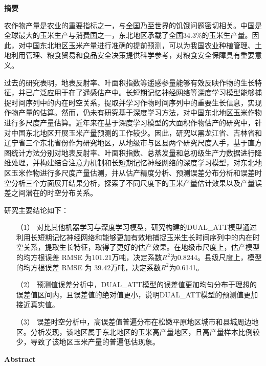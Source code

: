 \cleardoublepage{}
\begin{center}
    \bfseries {} 摘要
\end{center}

\par 农作物产量是农业的重要指标之一，与全国乃至世界的饥饿问题密切相关。中国是全球最大的玉米生产与消费国之一，东北地区承载了全国34.3\%的玉米生产量。因此，对中国东北地区玉米产量进行准确的提前预测，可以为我国农业种植管理、土地利用管理、粮食贸易和食品安全决策提供科学参考，对粮食安全保障具有重要意义。

\par 过去的研究表明，地表反射率、叶面积指数等遥感参量能够有效反映作物的生长特征，并已广泛应用于在了遥感估产中。长短期记忆神经网络等深度学习模型能够捕捉时间序列中的内在时空关系，提取并学习作物时间序列中的重要生长信息，实现作物产量的估算。然而，仍未有研究基于深度学习方法，对中国东北地区玉米作物进行多尺度产量估算。近年来在基于深度学习模型的大面积作物估产的研究中，针对中国东北地区开展玉米产量预测的工作较少。因此，研究以黑龙江省、吉林省和辽宁省三个东北省份作为研究地区，从地级市与区县两个研究尺度入手，基于直方图统计方法分别对地表反射率、叶面积指数、总蒸发量和总初级生产力数据进行降维处理，并构建结合注意力机制和长短期记忆神经网络的深度学习模型，对东北地区玉米作物进行多尺度产量估测，并从估产精度分析、预测误差分布分析和误差时空分析三个方面展开结果分析，探索了不同尺度下的玉米产量估计效果以及产量误差之间潜在的时空分布关系。

\par 研究主要结论如下：

\begin{itemize}
  \item [（1）] 对比其他机器学习与深度学习模型，研究构建的DUAL\_ATT模型通过利用长短期记忆神经网络和能够更加有效地捕捉玉米生长时间序列中的内在时空关系，提取生长特征，取得了更好的估产效果。在地级市尺度上，估产模型的均方根误差 RMSE 为101.21万吨，决定系数$R^2$为0.8244。县级尺度上，模型的均方根误差 RMSE 为 39.42万吨，决定系数$R^2$为0.6141。
  \item [（2）] 预测值误差分析中，DUAL\_ATT模型的误差值更加均匀分布于理想的误差值区间内，且误差值的绝对值更小，说明DUAL\_ATT模型的预测值更加接近真实值。
  \item [（3）] 误差时空分析中，高误差值普遍分布在松嫩平原地区城市和县城周边地区。分析发现，该地区属于东北地区的玉米高产量地区，且高产量样本比例较少，导致了该地区玉米产量的普遍低估现象。
\end{itemize}

\cleardoublepage{}
\begin{center}
    \bfseries {} Abstract
\end{center}

